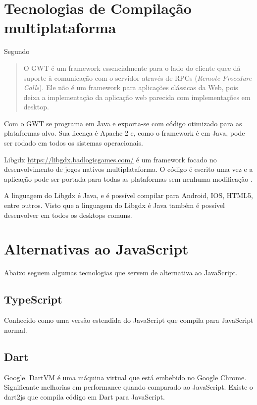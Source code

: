 \chapter{Tecnologias de Compilação multiplataforma}

Segundo \citet[p. 29]{gwt}
\begin{quote}
O GWT é um framework essencialmente para o lado do cliente quee dá
suporte à comunicação com o servidor através de RPCs (\textit{Remote
Procedure Calls}). Ele não é um framework para aplicações clássicas
da Web, pois deixa a implementação da aplicação web parecida com
implementações em desktop.
\end{quote}

Com o GWT se programa em Java e exporta-se com código otimizado para
as plataformas alvo. Sua licença é Apache 2 e, como o framework é em Java,
pode ser rodado em todos os sistemas operacionais.

Libgdx \url{https://libgdx.badlogicgames.com/} é um framework
focado no desenvolvimento de jogos nativos multiplataforma. O
código é escrito uma vez e a aplicação pode ser portada para
todas as plataformas sem nenhuma modificação \autocite[p.
8]{crossPlatformMobileGameDevelopment}.

A linguagem do Libgdx é Java, e é possível compilar para Android,
IOS, HTML5, entre outros. Visto que a linguagem do Libgdx é Java
também é possível desenvolver em todos os desktops comuns.

\chapter{Alternativas ao JavaScript}

Abaixo seguem algumas tecnologias que servem de alternativa ao
JavaScript.

\section{TypeScript}

Conhecido como uma versão estendida do JavaScript que compila para
JavaScript normal.

\section{Dart}

Google. DartVM é uma máquina virtual que está embebido no Google
Chrome. Significante melhorias em performance quando comparado
ao JavaScript. Existe o dart2js que compila código em Dart para
JavaScript.

